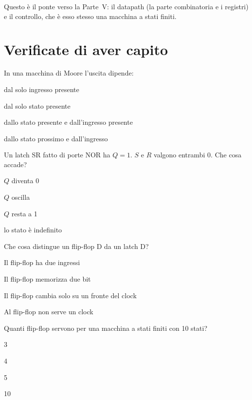 Questo è il ponte verso la Parte~V: il datapath (la parte combinatoria e i
registri) e il controllo, che è esso stesso una macchina a stati finiti.





\section{Verificate di aver capito}

\begin{quiz}{In una macchina di Moore l'uscita dipende:}
\item dal solo ingresso presente
\item dal solo stato presente
\item dallo stato presente e dall'ingresso presente
\item dallo stato prossimo e dall'ingresso
\end{quiz}

\begin{quiz}{Un latch SR fatto di porte NOR ha $Q=1$. $S$ e $R$ valgono entrambi 0. Che cosa accade?}
\item $Q$ diventa 0
\item $Q$ oscilla
\item $Q$ resta a 1
\item lo stato è indefinito
\end{quiz}

\begin{quiz}{Che cosa distingue un flip-flop D da un latch D?}
\item Il flip-flop ha due ingressi
\item Il flip-flop memorizza due bit
\item Il flip-flop cambia solo su un fronte del clock
\item Al flip-flop non serve un clock
\end{quiz}

\begin{quiz}{Quanti flip-flop servono per una macchina a stati finiti con 10 stati?}
\item 3
\item 4
\item 5
\item 10
\end{quiz}

